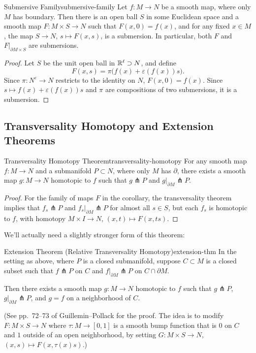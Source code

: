 \begin{corollary}{Submersive Family}{submersive-family}
    Let $f \colon M \to N$ be a smooth map, where only $M$ has boundary. Then there is an open ball $S$ in some Euclidean space and a smooth map $F \colon M \times S \to N$ such that $F(x, 0) = f(x)$, and for any fixed $x \in M$, the map $S \to N$, $s \mapsto F(x, s)$, is a submersion. In particular, both $F$ and $F|_{\partial M \times S}$ are submersions.
\end{corollary}

\begin{proof}
    Let $S$ be the unit open ball in $\mathbb{R}^\ell \supset N$, and define
    \[
        F(x, s) = \pi\bigl(f(x) + \varepsilon(f(x)) s\bigr).
    \]
    Since $\pi \colon N^\varepsilon \to N$ restricts to the identity on $N$, $F(x, 0) = f(x)$. Since $s \mapsto f(x) + \varepsilon(f(x)) s$ and $\pi$ are compositions of two submersions, it is a submersion.
\end{proof}

\subsection{Transversality Homotopy and Extension Theorems}

\begin{theorem}{Transversality Homotopy Theorem}{transversality-homotopy}
    For any smooth map $f \colon M \to N$ and a submanifold $P \subset N$, where only $M$ has $\partial$, there exists a smooth map $g \colon M \to N$ homotopic to $f$ such that $g \pitchfork P$ and $g|_{\partial M} \pitchfork P$.
\end{theorem}

\begin{proof}
    For the family of maps $F$ in the corollary, the transversality theorem implies that $f_s \pitchfork P$ and $f_s|_{\partial M} \pitchfork P$ for almost all $s \in S$, but each $f_s$ is homotopic to $f$, with homotopy $M \times I \to N$, $(x, t) \mapsto F(x, ts)$.
\end{proof}

We'll actually need a slightly stronger form of this theorem:

\begin{theorem}{Extension Theorem (Relative Transversality Homotopy)}{extension-thm}
    In the setting as above, where $P$ is a closed submanifold, suppose $C \subset M$ is a closed subset such that $f \pitchfork P$ on $C$ and $f|_{\partial M} \pitchfork P$ on $C \cap \partial M$.

    Then there exists a smooth map $g \colon M \to N$ homotopic to $f$ such that $g \pitchfork P$, $g|_{\partial M} \pitchfork P$, and $g = f$ on a neighborhood of $C$.

    (See pp.~72--73 of Guillemin--Pollack for the proof. The idea is to modify $F \colon M \times S \to N$ where $\tau \colon M \to [0,1]$ is a smooth bump function that is $0$ on $C$ and $1$ outside of an open neighborhood, by setting $G \colon M \times S \to N$, $(x, s) \mapsto F(x, \tau(x) s)$.)
\end{theorem}

